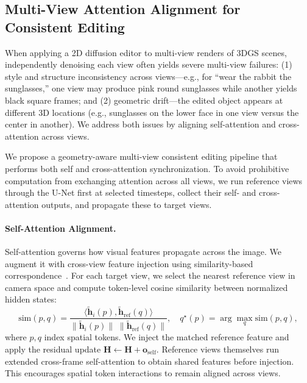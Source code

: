 
\subsection{Multi-View Attention Alignment for Consistent Editing}
\label{sec:multi_attn_align}

When applying a 2D diffusion editor to multi-view renders of 3DGS scenes, independently denoising each view often yields severe multi-view failures: (1) style and structure inconsistency across views---e.g., for ``wear the rabbit the sunglasses,'' one view may produce pink round sunglasses while another yields black square frames; and (2) geometric drift---the edited object appears at different 3D locations (e.g., sunglasses on the lower face in one view versus the center in another). We address both issues by aligning self-attention and cross-attention across views.

We propose a geometry-aware multi-view consistent editing pipeline that performs both self and cross-attention synchronization. To avoid prohibitive computation from exchanging attention across all views, we run reference views through the U-Net first at selected timesteps, collect their self- and cross-attention outputs, and propagate these to target views.

\paragraph{Self-Attention Alignment.}
Self-attention governs how visual features propagate across the image. We augment it with cross-view feature injection using similarity-based correspondence~\cite{geyer_tokenflow_, chen2024dge}. For each target view, we select the nearest reference view in camera space and compute token-level cosine similarity between normalized hidden states:
\begin{equation}
\mathrm{sim}(p,q) = \frac{\langle \tilde{\mathbf{h}}_{i}(p), \tilde{\mathbf{h}}_{\mathrm{ref}}(q)\rangle}{\|\tilde{\mathbf{h}}_{i}(p)\|\;\|\tilde{\mathbf{h}}_{\mathrm{ref}}(q)\|},
\quad
q^\star(p) = \arg\max_q \mathrm{sim}(p,q),
\label{eq:self_sim_nn}
\end{equation}
where $p,q$ index spatial tokens. We inject the matched reference feature and apply the residual update $\mathbf{H} \leftarrow \mathbf{H} + \mathbf{o}_{\mathrm{self}}$. Reference views themselves run extended cross-frame self-attention to obtain shared features before injection. This encourages spatial token interactions to remain aligned across views.

